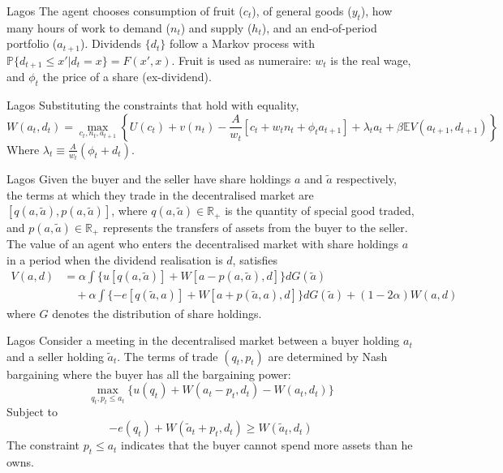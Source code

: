 \documentclass[aspectratio=169,xcolor=dvipsnames]{beamer}
\begin{document}
\begin{frame}{Lagos}
    The agent chooses consumption of fruit ($c_t$), of general goods ($y_t$), how many hours of work to demand ($n_t$) and supply ($h_t$), and an end-of-period portfolio ($a_{t+1}$). Dividends $\{d_t\}$ follow a Markov process with $\mathbb{P}\{d_{t+1} \le x'| d_t = x\} = F(x', x)$. Fruit is used as numeraire: $w_t$ is the real wage, and $\phi_t$ the price of a share (ex-dividend).
\end{frame}

\begin{frame}{Lagos}
    Substituting the constraints that hold with equality,
    \[
        W(a_t, d_t) = \max_{c_t, n_t, a_{t+1}} \left\{ U(c_t) + v(n_t) - \frac{A}{w_t}[c_t + w_t n_t + \phi_t a_{t+1}] + \lambda_t a_t + \beta \mathbb{E} V(a_{t+1}, d_{t+1})\right\}
    \]
    Where $\lambda_t \equiv \frac{A}{w_t}(\phi_t + d_t)$.
\end{frame}

\begin{frame}{Lagos}
    Given the buyer and the seller have share holdings $a$ and $\tilde a$ respectively, the terms at which they trade in the decentralised market are $[q(a, \tilde a), p(a, \tilde a)]$, where $q(a, \tilde a) \in \mathbb{R}_+$ is the quantity of special good traded, and $p(a, \tilde a) \in \mathbb{R}_+$ represents the transfers of assets from the buyer to the seller. The value of an agent who enters the decentralised market with share holdings $a$ in a period when the dividend realisation is $d$, satisfies
    \begin{align*}
        V(a, d) &= \alpha \int \{u[q(a, \tilde a)] + W[a - p(a, \tilde a), d]\} dG(\tilde a) \\
        &\quad + \alpha \int \{-e[q(\tilde a, a)] + W[a + p(\tilde a, a), d]\} dG(\tilde a) + (1 - 2\alpha) W(a, d)
    \end{align*}
    where $G$ denotes the distribution of share holdings.
\end{frame}

\begin{frame}{Lagos}
    Consider a meeting in the decentralised market between a buyer holding $a_t$ and a seller holding $\tilde a_t$. The terms of trade $(q_t, p_t)$ are determined by Nash bargaining where the buyer has all the bargaining power:
    \[
        \max_{q_t, p_t \le a_t} \{u(q_t) + W(a_t - p_t, d_t) - W(a_t, d_t)\}
    \]
    Subject to
    \[
        -e(q_t) + W(\tilde a_t + p_t, d_t) \ge W(\tilde a_t, d_t)
    \]
    The constraint $p_t \le a_t$ indicates that the buyer cannot spend more assets than he owns.
\end{frame}
\end{document}
